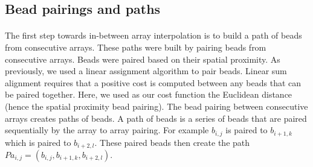 \documentclass[10pt,a4paper]{article}
\begin{document}
\subsection{Bead pairings and paths}
\paragraph{}The first step towards in-between array interpolation is to build a path of beads from consecutive arrays.
These paths were built by pairing beads from consecutive arrays.
Beads were paired based on their spatial proximity.
As previously, we used a linear assignment algorithm to pair beads.
Linear sum alignment requires that a positive cost is computed between any beads that can be paired together.
Here, we used as our cost function the Euclidean distance (hence the spatial proximity bead pairing).
The bead pairing between consecutive arrays creates paths of beads. A path of beads is a series of beads that are paired sequentially by the array to array pairing.
For example \(b_{i,j}\) is paired to \(b_{i+1,k}\) which is paired to \(b_{i+2,l}\). These paired beads then create the path \(Pa_{i,j}=(b_{i,j}, b_{i+1,k},b_{i+2,l})\).
\end{document}
